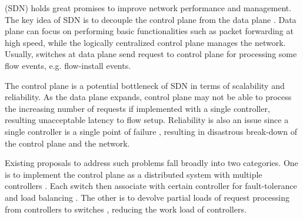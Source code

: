 \documentclass[10pt,journal,compsoc]{IEEEtran}
\begin{document}
%
\IEEEpeerreviewmaketitle



 (SDN) holds great promises to improve network performance and management. The key idea of SDN is to decouple the control plane from the data plane \cite{mckeown2008openflow}. Data plane can focus on performing basic functionalities such as packet forwarding at high speed, while the logically centralized control plane manages the network. Usually, switches at data plane send request to control plane for processing some flow events, e.g. flow-install events.

The control plane is a potential bottleneck of SDN in terms of scalability and reliability. As the data plane expands, control plane may not be able to process the increasing number of requests if implemented with a single controller, resulting unacceptable latency to flow setup. Reliability is also an issue since a single controller is a single point of failure , resulting in disastrous break-down of the control plane and the network. 

Existing proposals to address such problems fall broadly into two categories. One is to implement the control plane as a distributed system with multiple controllers \cite{koponen2010onix} \cite{tootoonchian2010hyperflow}. Each switch then associate with certain controller for fault-tolerance and load balancing \cite{levin2012logically} \cite{dixit2013towards}\cite{krishnamurthy2014pratyaastha}\cite{wang2016dynamic}. The other is to devolve partial loads of request processing from controllers to switches \cite{curtis2011devoflow} \cite{hassas2012kandoo}  \cite{zheng2015lazyctrl}, reducing the work load of controllers.
\end{document}
